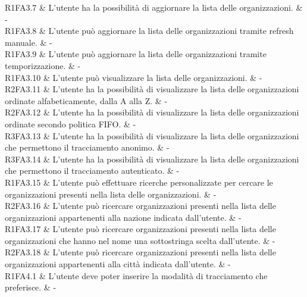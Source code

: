 R1FA3.7 & L’utente ha la possibilità di aggiornare la lista delle organizzazioni.  & - \\

R1FA3.8 & L’utente può aggiornare la lista delle organizzazioni tramite refresh manuale.  & - \\

R1FA3.9 & L’utente può aggiornare la lista delle organizzazioni tramite temporizzazione. & - \\

R1FA3.10 & L’utente può visualizzare la lista delle organizzazioni. & - \\

R2FA3.11 & L’utente ha la possibilità di visualizzare la lista delle organizzazioni ordinate alfabeticamente, dalla A alla Z.  & - \\

R2FA3.12 & L’utente ha la possibilità di visualizzare la lista delle organizzazioni ordinate secondo politica FIFO.  & - \\

R3FA3.13 & L’utente ha la possibilità di visualizzare la lista delle organizzazioni che permettono il tracciamento anonimo. & - \\

R3FA3.14 & L’utente ha la possibilità di visualizzare la lista delle organizzazioni che permettono il tracciamento autenticato.  & - \\

R1FA3.15 & L’utente può effettuare ricerche personalizzate per cercare le organizzazioni presenti nella lista delle organizzazioni.  & - \\

R2FA3.16 & L’utente può ricercare organizzazioni presenti nella lista delle organizzazioni appartenenti alla nazione indicata dall’utente. & - \\

R1FA3.17 & L’utente può ricercare organizzazioni presenti nella lista delle organizzazioni che hanno nel nome una sottostringa scelta dall'utente.  & - \\

R2FA3.18 & L’utente può ricercare organizzazioni presenti nella lista delle organizzazioni appartenenti alla città indicata dall’utente.  & - \\

R1FA4.1 & L’utente deve poter inserire la modalità di tracciamento che preferisce. & - \\

